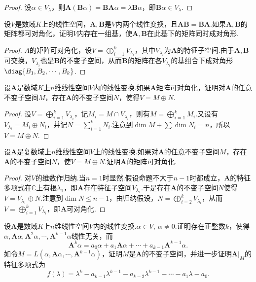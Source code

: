 \begin{proof}
	设$\alpha\in V_\lambda$，则$\bm A(\bm B\alpha)=\bm{BA}\alpha=\lambda\bm B\alpha$，即$\bm B\alpha\in V_\lambda$.
\end{proof}
\begin{prob}[21]
	设$V$是数域$K$上的线性空间，$\bm A,\bm B$是$V$内两个线性变换，且$\bm{AB}=\bm{BA}$.如果$\bm A,\bm B$的矩阵都可对角化，证明$V$内存在一组基，使$\bm A,\bm B$在此基下的矩阵同时成对角形.
\end{prob}
\begin{proof}
	$A$的矩阵可对角化，设$V=\displaystyle\bigoplus_{i=1}^kV_{\lambda_i}$，其中$V_{\lambda_i}$为$\bm A$的特征子空间.由于$\bm A,\bm B$可交换，$V_{\lambda_i}$也是$\bm B$的不变子空间，从而$\bm B$的矩阵在各$V_{\lambda_i}$的基组合下成对角形$\diag{B_1,B_2,\cdots,B_k}$.
\end{proof}
\begin{prob}[22]
	设$\bm A$是数域$K$上$n$维线性空间$V$内的线性变换.如果$\bm A$矩阵可对角化，证明对$\bm A$的任意不变子空间$M$，存在$\bm A$的不变子空间$N$，使得$V=M\oplus N$.
\end{prob}
\begin{proof}
	设$V=\displaystyle\bigoplus_{i=1}^kV_{\lambda_i}$，记$M_i=M\cap V_{\lambda_i}$，则有$M=\displaystyle\bigoplus_{i=1}^kM_i$.又设有$V_{\lambda_i}=M_i\oplus N_i$，并记$N=\sum_{i=1}^{k}N_i$.注意到$\dim M+\sum\dim N_i=n$，所以$V=M\oplus N$.
\end{proof}
\begin{prob}[23]
	设$\bm A$是复数域上$n$维线性空间$V$上的线性变换.如果对$\bm A$的任意不变子空间$M$，存在$\bm A$的不变子空间$N$，使$V=M\oplus N$.证明$\bm A$的矩阵可对角化.
\end{prob}
\begin{proof}
	对$V$的维数作归纳.当$n=1$时显然.假设命题不大于$n-1$时都成立，$\bm A$的特征多项式在$\mathbb{C}$上有根$\lambda_1$，即$\bm A$存在特征子空间$V_{\lambda_1}$.于是存在$\bm A$的不变子空间$N$使得$V=V_{\lambda_1}\oplus N$.注意到$\dim N\le n-1$，由归纳假设，$N=\displaystyle\bigoplus_{i=2}^kV_{\lambda_i}$，从而$V=\displaystyle\bigoplus_{i=1}^kV_{\lambda_i}$，即$\bm A$可对角化.
\end{proof}
\begin{prob}[24]
	设$\bm A$是数域$K$上$n$维线性空间$V$内的线性变换.$\alpha\in V,\ \alpha\ne0$.证明存在正整数$k$，使得$\alpha,\bm A\alpha,\bm A^2\alpha,\cdots,\bm A^{k-1}\alpha$线性无关，而
	\[
		\bm A^k\alpha=a_0\alpha+a_1\bm A\alpha+\cdots+a_{k-1}\bm A^{k-1}\alpha.
	\]
	如令$M=L(\alpha,\bm A\alpha,\cdots,\bm A^{k-1}\alpha)$，证明$M$是$\bm A$的不变子空间，并进一步证明$\bm A|_M$的特征多项式为
	\[
		f(\lambda)=\lambda^k-a_{k-1}\lambda^{k-1}-a_{k-2}\lambda^{k-1}-\cdots-a_1\lambda-a_0.
	\]
\end{prob}
